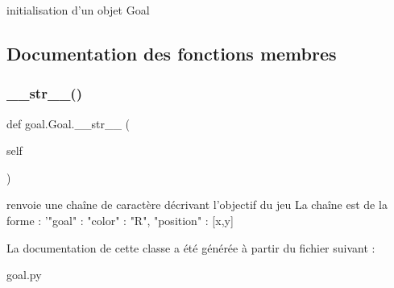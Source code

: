 \begin{DoxyVerb}initialisation d'un objet Goal \end{DoxyVerb}
 

\subsection{Documentation des fonctions membres}
\mbox{\label{classgoal_1_1Goal_af125fb03f7d4358fbf776a30da242df1}} 
\subsubsection{\texorpdfstring{\+\_\+\+\_\+str\+\_\+\+\_\+()}{\_\_str\_\_()}}
{\footnotesize\ttfamily def goal.\+Goal.\+\_\+\+\_\+str\+\_\+\+\_\+ (\begin{DoxyParamCaption}\item[{}]{self }\end{DoxyParamCaption})}

\begin{DoxyVerb}renvoie une chaîne de caractère décrivant l'objectif du jeu 
La chaîne est de la forme :
'"goal" : { "color" : "R",
    "position" : [x,y]
    }
\end{DoxyVerb}
 

La documentation de cette classe a été générée à partir du fichier suivant \+:\begin{DoxyCompactItemize}
\item 
goal.\+py\end{DoxyCompactItemize}
